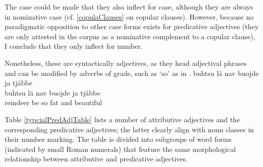 The case could be made that they also inflect for case, although they are always in nominative case (cf. \SEC\ref{copulaClauses} on copular clauses). %
However, because no paradigmatic opposition to other case forms exists for predicative adjectives (they are only attested in the corpus as a nominative complement to a copular clause), I conclude that they only inflect for number. 

Nonetheless, these are syntactically adjectives, as they head adjectival phrases and can be modified by adverbs of grade, such as  ‘so’ as in .
\ea\label{adjPredEx3}
\glll	buhtsu lä nav buojde ja tjábbe\\
	buhtsu lä nav buojde ja tjábbe\\
	reindeer\BS{} be\BS{} so fat\BS{} and beautiful\BS{}\\\nopagebreak
{}	
\z

Table \vref{typcialPredAdjTable} lists a number of attributive adjectives and the corresponding predicative adjectives; the latter clearly align with noun classes in their number marking. %
The table is divided into subgroups of word forms (indicated by small Roman numerals) that feature the same morphological relationship between attributive and predicative adjectives. 

